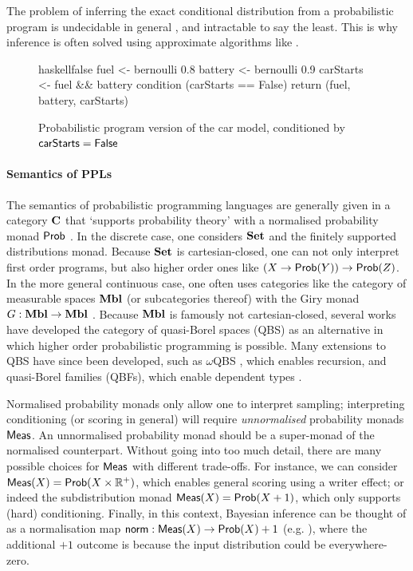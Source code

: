 \documentclass[11pt,a4paper]{article}
\begin{document}
The problem of inferring the exact conditional distribution from a probabilistic program is undecidable in general , and intractable to say the least. This is why inference is often solved using approximate algorithms like .

\begin{figure}
    \centering
    \begin{codelisting}{haskell}{false}
    fuel    <- bernoulli 0.8
    battery <- bernoulli 0.9 
    carStarts <- fuel && battery
    condition (carStarts == False)
    return (fuel, battery, carStarts)
    \end{codelisting}
    \caption{Probabilistic program version of the car model, conditioned by $\mathsf{carStarts} = \mathsf{False}$}
    \label{fig:rung1program}
\end{figure}

\paragraph{Semantics of PPLs} The semantics of probabilistic programming languages are generally given in a category $\mathbf{C}$ that `supports probability theory' with a normalised probability monad $\mathsf{Prob}$ . In the discrete case, one considers $\mathbf{Set}$ and the finitely supported distributions monad. Because $\mathbf{Set}$ is cartesian-closed, one can not only interpret first order programs, but also higher order ones like $(X \to \mathsf{Prob}(Y)) \to \mathsf{Prob}(Z)$. In the more general continuous case, one often uses categories like the category of measurable spaces $\mathbf{Mbl}$ (or subcategories thereof) with the Giry monad $G: \mathbf{Mbl} \to \mathbf{Mbl}$ . Because $\mathbf{Mbl}$ is famously not cartesian-closed, several works \cite{semantics_ppl_staton2016,Heunen_2017} have developed the category of quasi-Borel spaces (QBS) as an alternative in which higher order probabilistic programming is possible. Many extensions to QBS have since been developed, such as $\omega$QBS , which enables recursion, and quasi-Borel families (QBFs), which enable dependent types . 

Normalised probability monads only allow one to interpret sampling; interpreting conditioning (or scoring in general) will require \emph{unnormalised} probability monads $\mathsf{Meas}$. An unnormalised probability monad should be a super-monad of the normalised counterpart. Without going into too much detail, there are many possible choices for $\mathsf{Meas}$ with different trade-offs. For instance, we can consider $\mathsf{Meas}(X) = \mathsf{Prob}(X \times \mathbb{R}^+)$, which enables general scoring using a writer effect; or indeed the subdistribution monad $\mathsf{Meas}(X) = \mathsf{Prob}(X + 1)$, which only supports (hard) conditioning. Finally, in this context, Bayesian inference can be thought of as a normalisation map $\mathsf{norm}: \mathsf{Meas}(X) \to \mathsf{Prob}(X) + 1$ (e.g. \cite{semantics_ppl_staton2016}), where the additional $+1$ outcome is because the input distribution could be everywhere-zero. 
\end{document}
